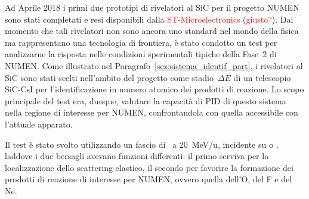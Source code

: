 Ad Aprile 2018 i primi due prototipi di rivelatori al SiC per il progetto NUMEN sono stati completati e resi disponibili dalla \textcolor{red}{ST-Microelectronics} (\textcolor{red}{giusto?}).
Dal momento che tali rivelatori non sono ancora uno standard nel mondo della fisica ma rappresentano una tecnologia di frontiera, è stato condotto un test per analizzarne la risposta nelle condizioni sperimentali tipiche della Fase~2 di NUMEN.
Come illustrato nel Paragrafo~\ref{sez:sistema_identif_part}, i rivelatori al SiC sono stati scelti nell'ambito del progetto come stadio~$\Delta E$ di un telescopio SiC-CsI per l'identificazione in numero atomico dei prodotti di reazione.
Lo scopo principale del test era, dunque, valutare la capacità di PID di questo sistema nella regione di interesse per NUMEN, confrontandola con quella accessibile con l'attuale apparato.

Il test è stato svolto utilizzando un fascio di~ a 20~MeV/u, incidente su  o , laddove i due bersagli avevano funzioni differenti: il primo serviva per la localizzazione dello scattering elastico, il secondo per favorire la formazione dei prodotti di reazione di interesse per NUMEN, ovvero quella dell'O, del F e del Ne.







